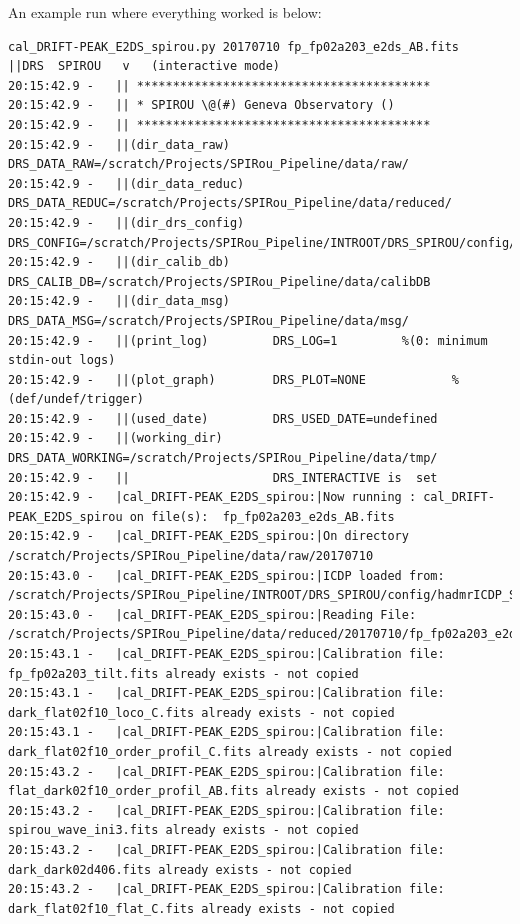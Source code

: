 An example run where everything worked is below:

\begin{lstlisting}[style=text]
cal_DRIFT-PEAK_E2DS_spirou.py 20170710 fp_fp02a203_e2ds_AB.fits
||DRS  SPIROU   v   (interactive mode)
20:15:42.9 -   || *****************************************
20:15:42.9 -   || * SPIROU \@(#) Geneva Observatory ()
20:15:42.9 -   || *****************************************
20:15:42.9 -   ||(dir_data_raw)      DRS_DATA_RAW=/scratch/Projects/SPIRou_Pipeline/data/raw/
20:15:42.9 -   ||(dir_data_reduc)    DRS_DATA_REDUC=/scratch/Projects/SPIRou_Pipeline/data/reduced/
20:15:42.9 -   ||(dir_drs_config)    DRS_CONFIG=/scratch/Projects/SPIRou_Pipeline/INTROOT/DRS_SPIROU/config/
20:15:42.9 -   ||(dir_calib_db)      DRS_CALIB_DB=/scratch/Projects/SPIRou_Pipeline/data/calibDB
20:15:42.9 -   ||(dir_data_msg)      DRS_DATA_MSG=/scratch/Projects/SPIRou_Pipeline/data/msg/
20:15:42.9 -   ||(print_log)         DRS_LOG=1         %(0: minimum stdin-out logs)
20:15:42.9 -   ||(plot_graph)        DRS_PLOT=NONE            %(def/undef/trigger)
20:15:42.9 -   ||(used_date)         DRS_USED_DATE=undefined
20:15:42.9 -   ||(working_dir)       DRS_DATA_WORKING=/scratch/Projects/SPIRou_Pipeline/data/tmp/
20:15:42.9 -   ||                    DRS_INTERACTIVE is  set
20:15:42.9 -   |cal_DRIFT-PEAK_E2DS_spirou:|Now running : cal_DRIFT-PEAK_E2DS_spirou on file(s):  fp_fp02a203_e2ds_AB.fits
20:15:42.9 -   |cal_DRIFT-PEAK_E2DS_spirou:|On directory /scratch/Projects/SPIRou_Pipeline/data/raw/20170710
20:15:43.0 -   |cal_DRIFT-PEAK_E2DS_spirou:|ICDP loaded from: /scratch/Projects/SPIRou_Pipeline/INTROOT/DRS_SPIROU/config/hadmrICDP_SPIROU.py
20:15:43.0 -   |cal_DRIFT-PEAK_E2DS_spirou:|Reading File: /scratch/Projects/SPIRou_Pipeline/data/reduced/20170710/fp_fp02a203_e2ds_AB.fits
20:15:43.1 -   |cal_DRIFT-PEAK_E2DS_spirou:|Calibration file: fp_fp02a203_tilt.fits already exists - not copied
20:15:43.1 -   |cal_DRIFT-PEAK_E2DS_spirou:|Calibration file: dark_flat02f10_loco_C.fits already exists - not copied
20:15:43.1 -   |cal_DRIFT-PEAK_E2DS_spirou:|Calibration file: dark_flat02f10_order_profil_C.fits already exists - not copied
20:15:43.2 -   |cal_DRIFT-PEAK_E2DS_spirou:|Calibration file: flat_dark02f10_order_profil_AB.fits already exists - not copied
20:15:43.2 -   |cal_DRIFT-PEAK_E2DS_spirou:|Calibration file: spirou_wave_ini3.fits already exists - not copied
20:15:43.2 -   |cal_DRIFT-PEAK_E2DS_spirou:|Calibration file: dark_dark02d406.fits already exists - not copied
20:15:43.2 -   |cal_DRIFT-PEAK_E2DS_spirou:|Calibration file: dark_flat02f10_flat_C.fits already exists - not copied

\end{lstlisting}
